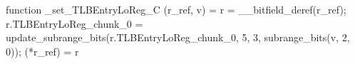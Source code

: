 function _set_TLBEntryLoReg_C (r_ref, v) = {
    r = __bitfield_deref(r_ref);
    r.TLBEntryLoReg_chunk_0 = update_subrange_bits(r.TLBEntryLoReg_chunk_0, 5, 3, subrange_bits(v, 2, 0));
    (*r_ref) = r
}
